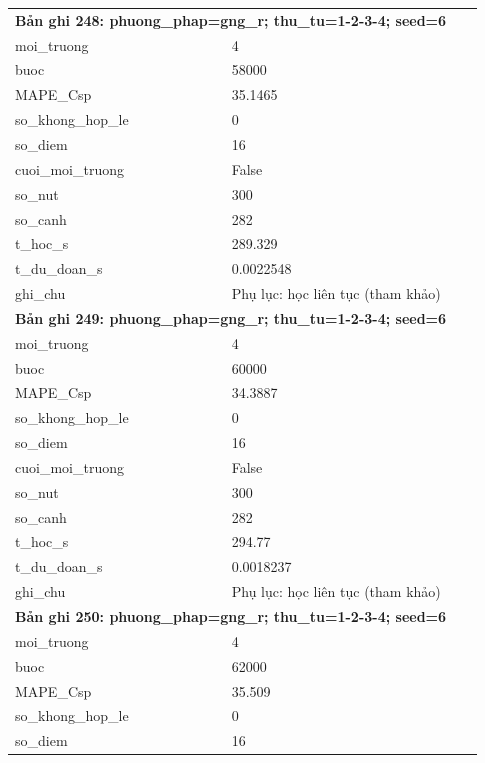 \begin{longtable}{p{0.43\linewidth}p{0.50\linewidth}}
\midrule
\multicolumn{2}{p{0.95\linewidth}}{\textbf{Bản ghi 248: phuong\_phap=gng\_r; thu\_tu=1-2-3-4; seed=6}} \\
moi\_\allowbreak truong & 4 \\
buoc & 58000 \\
MAPE\_\allowbreak Csp & 35.1465 \\
so\_\allowbreak khong\_\allowbreak hop\_\allowbreak le & 0 \\
so\_\allowbreak diem & 16 \\
cuoi\_\allowbreak moi\_\allowbreak truong & False \\
so\_\allowbreak nut & 300 \\
so\_\allowbreak canh & 282 \\
t\_\allowbreak hoc\_\allowbreak s & 289.329 \\
t\_\allowbreak du\_\allowbreak doan\_\allowbreak s & 0.0022548 \\
ghi\_\allowbreak chu & Phụ lục: học liên tục (tham khảo) \\
\midrule
\multicolumn{2}{p{0.95\linewidth}}{\textbf{Bản ghi 249: phuong\_phap=gng\_r; thu\_tu=1-2-3-4; seed=6}} \\
moi\_\allowbreak truong & 4 \\
buoc & 60000 \\
MAPE\_\allowbreak Csp & 34.3887 \\
so\_\allowbreak khong\_\allowbreak hop\_\allowbreak le & 0 \\
so\_\allowbreak diem & 16 \\
cuoi\_\allowbreak moi\_\allowbreak truong & False \\
so\_\allowbreak nut & 300 \\
so\_\allowbreak canh & 282 \\
t\_\allowbreak hoc\_\allowbreak s & 294.77 \\
t\_\allowbreak du\_\allowbreak doan\_\allowbreak s & 0.0018237 \\
ghi\_\allowbreak chu & Phụ lục: học liên tục (tham khảo) \\
\midrule
\multicolumn{2}{p{0.95\linewidth}}{\textbf{Bản ghi 250: phuong\_phap=gng\_r; thu\_tu=1-2-3-4; seed=6}} \\
moi\_\allowbreak truong & 4 \\
buoc & 62000 \\
MAPE\_\allowbreak Csp & 35.509 \\
so\_\allowbreak khong\_\allowbreak hop\_\allowbreak le & 0 \\
so\_\allowbreak diem & 16 \\

\end{longtable}
